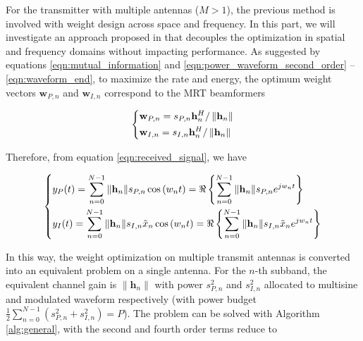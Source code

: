 For the transmitter with multiple antennas ($M > 1$), the previous method is involved with weight design across space and frequency. In this part, we will investigate an approach proposed in \cite{Clerckx2018} that decouples the optimization in spatial and frequency domains without impacting performance. As suggested by equations \ref{eqn:mutual_information} and \ref{eqn:power_waveform_second_order} -- \ref{eqn:waveform_end}, to maximize the rate and energy, the optimum weight vectors ${{\mathbf{w}}_{P,n}}$ and ${{\mathbf{w}}_{I,n}}$ correspond to the MRT beamformers

\begin{equation}\label{eqn:mrt_weights}
  \left\{ \begin{gathered}
  {{\mathbf{w}}_{P,n}} = {s_{P,n}}{\mathbf{h}}_n^H/\left\| {{{\mathbf{h}}_n}} \right\| \hfill \\
  {{\mathbf{w}}_{I,n}} = {s_{I,n}}{\mathbf{h}}_n^H/\left\| {{{\mathbf{h}}_n}} \right\| \hfill \\
  \end{gathered}  \right.
\end{equation}

Therefore, from equation \ref{eqn:received_signal}, we have

\begin{equation}\label{eqn:mrt_received_components}
\left\{ \begin{gathered}
  {y_P}(t) = \sum\limits_{n = 0}^{N - 1} {\left\| {{{\mathbf{h}}_n}} \right\|} {s_{P,n}}\cos \left( {{w_n}t} \right) = \Re \left\{ {\sum\limits_{n = 0}^{N - 1} {\left\| {{{\mathbf{h}}_n}} \right\|} {s_{P,n}}{e^{j{w_n}t}}} \right\} \hfill \\
  {y_I}(t) = \sum\limits_{n = 0}^{N - 1} {\left\| {{{\mathbf{h}}_n}} \right\|} {s_{I,n}}{{\tilde x}_n}\cos \left( {{w_n}t} \right) = \Re \left\{ {\sum\limits_{n = 0}^{N - 1} {\left\| {{{\mathbf{h}}_n}} \right\|} {s_{I,n}}{{\tilde x}_n}{e^{j{w_n}t}}} \right\} \hfill \\
\end{gathered}  \right.
\end{equation}

In this way, the weight optimization on multiple transmit antennas is converted into an equivalent problem on a single antenna. For the $n$-th subband, the equivalent channel gain is $\left\| {{{\mathbf{h}}_n}} \right\|$ with power $s_{P,n}^2$ and $s_{I,n}^2$ allocated to multisine and modulated waveform respectively (with power budget $\frac{1}{2}\sum\limits_{n = 0}^{N - 1} {\left( {s_{P,n}^2 + s_{I,n}^2} \right)}  = P$). The problem can be solved with Algorithm \ref{alg:general}, with the second and fourth order terms reduce to

